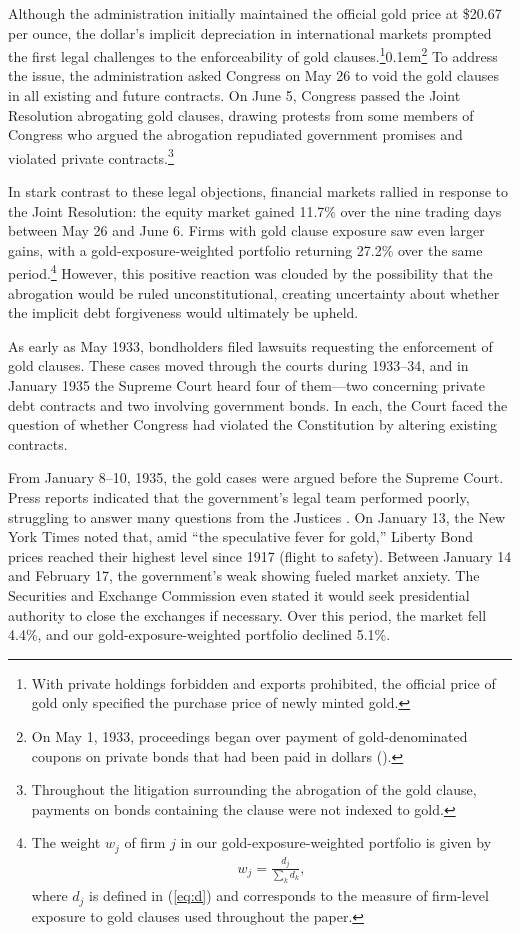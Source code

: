 Although the administration initially maintained the official gold price at \$20.67 per ounce, the dollar’s implicit depreciation in international markets prompted the first legal challenges to the enforceability of gold clauses.\footnote{With private holdings forbidden and exports prohibited, the official price of gold only specified the purchase price of newly minted gold.}\kern0.1em\footnote{On May 1, 1933, proceedings began over payment of gold-denominated coupons on private bonds that had been paid in dollars (\cite{Edwards2018}).} To address the issue, the administration asked Congress on May 26 to void the gold clauses in all existing and future contracts. On June 5, Congress passed the Joint Resolution abrogating gold clauses, drawing protests from some members of Congress who argued the abrogation repudiated government promises and violated private contracts.\footnote{Throughout the litigation surrounding the abrogation of the gold clause, payments on bonds containing the clause were not indexed to gold.}

In stark contrast to these legal objections, financial markets rallied in response to the Joint Resolution: the equity market gained 11.7\% over the nine trading days between May 26 and June 6. Firms with gold clause exposure saw even larger gains, with a gold-exposure-weighted portfolio returning 27.2\% over the same period.\footnote{The weight $w_{j}$ of firm $j$ in our gold-exposure-weighted portfolio is given by
\begin{align*}
    w_{j} = \frac{d_j}{\sum_{k}d_k},
\end{align*}
where $d_{j}$ is defined in (\ref{eq:d}) and corresponds to the measure of firm-level exposure to gold clauses used throughout the paper.
} However, this positive reaction was clouded by the possibility that the abrogation would be ruled unconstitutional, creating uncertainty about whether the implicit debt forgiveness would ultimately be upheld.

As early as May 1933, bondholders filed lawsuits requesting the enforcement of gold clauses. These cases moved through the courts during 1933–34, and in January 1935 the Supreme Court heard four of them---two concerning private debt contracts and two involving government bonds. In each, the Court faced the question of whether Congress had violated the Constitution by altering existing contracts.

From January 8–10, 1935, the gold cases were argued before the Supreme Court. Press reports indicated that the government’s legal team performed poorly, struggling to answer many questions from the Justices \citep{Edwards2018}. On January 13, the New York Times noted that, amid ``the speculative fever for gold,'' Liberty Bond prices reached their highest level since 1917 (flight to safety). Between January 14 and February 17, the government's weak showing fueled market anxiety. The Securities and Exchange Commission even stated it would seek presidential authority to close the exchanges if necessary. Over this period, the market fell 4.4\%, and our gold-exposure-weighted portfolio declined 5.1\%.

